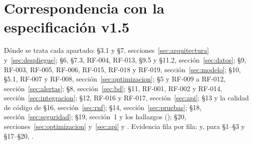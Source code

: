 \documentclass[10pt,a4paper]{article}
\begin{document}
\section{Correspondencia con la especificación v1.5}
\label{sec:correspondencia}
{\small Dónde se trata cada apartado: §3.1 y §7, secciones~\ref{sec:arquitectura} y~\ref{sec:despliegue}; §6, §7.3,
RF-004, RF-013, §9.5 y §11.2, sección~\ref{sec:datos}; §9, RF-003, RF-005, RF-006, RF-015, RF-018 y RF-019,
sección~\ref{sec:modelo}; §10, §5.1, RF-007 y RF-008, sección~\ref{sec:optimizacion}; §5 y RF-009 a RF-012,
sección~\ref{sec:alertas}; §8, sección~\ref{sec:bd}; §11, RF-001, RF-002 y RF-014, sección~\ref{sec:integracion};
§12, RF-016 y RF-017, sección~\ref{sec:api}; §13 y la calidad de código de §16, sección~\ref{sec:rnf}; §14,
sección~\ref{sec:pruebas}; §18, sección~\ref{sec:seguridad}; §19, sección~1 y los hallazgos (\HallazgosRango); §20,
secciones~\ref{sec:optimizacion} y~\ref{sec:api} y . Evidencia fila por
fila:  y, para §1--§3 y §17--§20, .\par}
\end{document}
